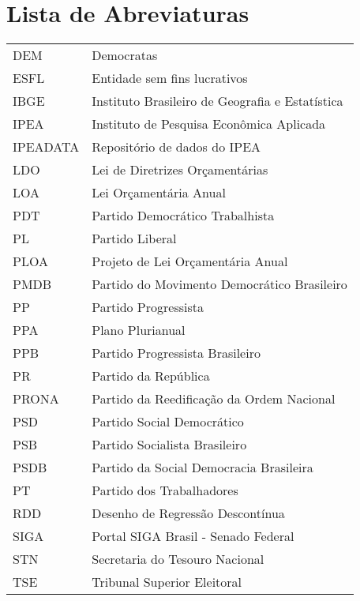 \documentclass[12pt,twoside,a4paper]{book}
\begin{document}
\pagebreak






\tableofcontents

\chapter{Lista de Abreviaturas}
\begin{tabular}{ll}
         DEM         & Democratas\\
         ESFL         & Entidade sem fins lucrativos\\
         IBGE           & Instituto Brasileiro de Geografia e Estatística\\
         IPEA         & Instituto de Pesquisa Econômica Aplicada\\
         IPEADATA	  & Repositório de dados do IPEA\\
         LDO			& Lei de Diretrizes Orçamentárias\\
         LOA			& Lei Orçamentária Anual\\
         PDT         & Partido Democrático Trabalhista\\
         PL			& Partido Liberal\\
         PLOA		& Projeto de Lei Orçamentária Anual\\
         PMDB         & Partido do Movimento Democrático Brasileiro\\
         PP         & Partido Progressista\\
         PPA			& Plano Plurianual\\
         PPB			& Partido Progressista Brasileiro\\
         PR         & Partido da República\\
         PRONA		& Partido da Reedificação da Ordem Nacional\\
         PSD			& Partido Social Democrático\\
         PSB         & Partido Socialista Brasileiro\\
         PSDB         & Partido da Social Democracia Brasileira\\
         PT         & Partido dos Trabalhadores\\
         RDD         & Desenho de Regressão Descontínua\\
         SIGA		& Portal SIGA Brasil - Senado Federal\\
         STN			& Secretaria do Tesouro Nacional\\
         TSE         & Tribunal Superior Eleitoral\\


\end{tabular}
\end{document}
